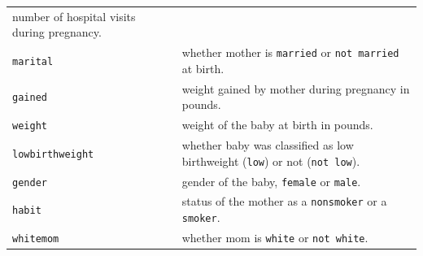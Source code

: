 \documentclass[]{article}
\begin{document}
\begin{longtable}[]{@{}ll@{}}
\begin{minipage}[t]{0.16\columnwidth}
number of hospital visits during pregnancy.\strut
\end{minipage}\tabularnewline
\begin{minipage}[t]{0.22\columnwidth}\raggedright\strut
\texttt{marital}\strut
\end{minipage} & \begin{minipage}[t]{0.16\columnwidth}\raggedright\strut
whether mother is \texttt{married} or \texttt{not\ married} at
birth.\strut
\end{minipage}\tabularnewline
\begin{minipage}[t]{0.22\columnwidth}\raggedright\strut
\texttt{gained}\strut
\end{minipage} & \begin{minipage}[t]{0.16\columnwidth}\raggedright\strut
weight gained by mother during pregnancy in pounds.\strut
\end{minipage}\tabularnewline
\begin{minipage}[t]{0.22\columnwidth}\raggedright\strut
\texttt{weight}\strut
\end{minipage} & \begin{minipage}[t]{0.16\columnwidth}\raggedright\strut
weight of the baby at birth in pounds.\strut
\end{minipage}\tabularnewline
\begin{minipage}[t]{0.22\columnwidth}\raggedright\strut
\texttt{lowbirthweight}\strut
\end{minipage} & \begin{minipage}[t]{0.16\columnwidth}\raggedright\strut
whether baby was classified as low birthweight (\texttt{low}) or not
(\texttt{not\ low}).\strut
\end{minipage}\tabularnewline
\begin{minipage}[t]{0.22\columnwidth}\raggedright\strut
\texttt{gender}\strut
\end{minipage} & \begin{minipage}[t]{0.16\columnwidth}\raggedright\strut
gender of the baby, \texttt{female} or \texttt{male}.\strut
\end{minipage}\tabularnewline
\begin{minipage}[t]{0.22\columnwidth}\raggedright\strut
\texttt{habit}\strut
\end{minipage} & \begin{minipage}[t]{0.16\columnwidth}\raggedright\strut
status of the mother as a \texttt{nonsmoker} or a \texttt{smoker}.\strut
\end{minipage}\tabularnewline
\begin{minipage}[t]{0.22\columnwidth}\raggedright\strut
\texttt{whitemom}\strut
\end{minipage} & \begin{minipage}[t]{0.16\columnwidth}\raggedright\strut
whether mom is \texttt{white} or \texttt{not\ white}.\strut
\end{minipage}\tabularnewline
\bottomrule
\end{longtable}
\end{document}
